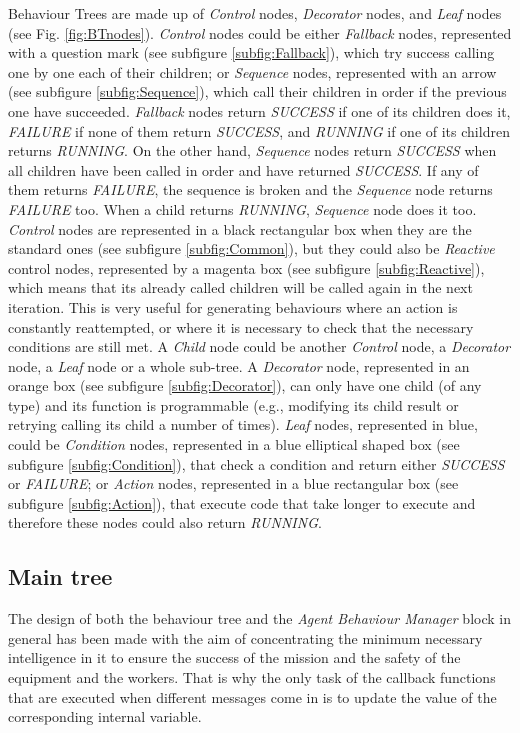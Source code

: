  Behaviour Trees are made up of \emph{Control} nodes, \emph{Decorator} nodes, and \emph{Leaf} nodes (see Fig. \ref{fig:BTnodes}). \emph{Control} nodes could be either \emph{Fallback} nodes, represented with a question mark (see subfigure \ref{subfig:Fallback}), which try success calling one by one each of their children; or \emph{Sequence} nodes, represented with an arrow (see subfigure \ref{subfig:Sequence}), which call their children in order if the previous one have succeeded. \emph{Fallback} nodes return \emph{SUCCESS} if one of its children does it, \emph{FAILURE} if none of them return \emph{SUCCESS}, and \emph{RUNNING} if one of its children returns \emph{RUNNING}. On the other hand, \emph{Sequence} nodes return \emph{SUCCESS} when all children have been called in order and have returned \emph{SUCCESS}. If any of them returns \emph{FAILURE}, the sequence is broken and the \emph{Sequence} node returns \emph{FAILURE} too. When a child returns \emph{RUNNING}, \emph{Sequence} node does it too. \emph{Control} nodes are represented in a black rectangular box when they are the standard ones (see subfigure \ref{subfig:Common}), but they could also be \emph{Reactive} control nodes, represented by a magenta box (see subfigure \ref{subfig:Reactive}), which means that its already called children will be called again in the next iteration. This is very useful for generating behaviours where an action is constantly reattempted, or where it is necessary to check that the necessary conditions are still met. A \emph{Child} node could be another \emph{Control} node, a \emph{Decorator} node, a \emph{Leaf} node or a whole sub-tree. A \emph{Decorator} node, represented in an orange box (see subfigure \ref{subfig:Decorator}), can only have one child (of any type) and its function is programmable (e.g., modifying its child result or retrying calling its child a number of times). \emph{Leaf} nodes, represented in blue, could be \emph{Condition} nodes, represented in a blue elliptical shaped box (see subfigure \ref{subfig:Condition}), that check a condition and return either \emph{SUCCESS} or \emph{FAILURE}; or \emph{Action} nodes, represented in a blue rectangular box (see subfigure \ref{subfig:Action}), that execute code that take longer to execute and therefore these nodes could also return \emph{RUNNING}.

\subsection{Main tree}
\label{sec:MainTree}
The design of both the behaviour tree and the \emph{Agent Behaviour Manager} block in general has been made with the aim of concentrating the minimum necessary intelligence in it to ensure the success of the mission and the safety of the equipment and the workers. That is why the only task of the callback functions that are executed when different messages come in is to update the value of the corresponding internal variable. 

